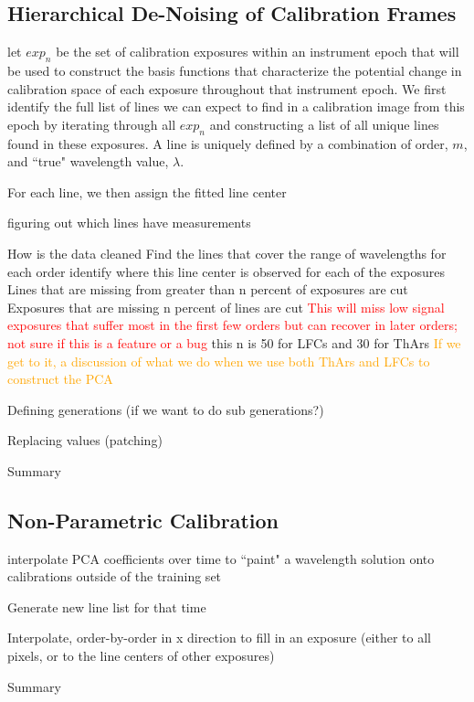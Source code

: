 \documentclass[12pt, letterpaper]{article}
\newcommand{\lz}[1]{\textcolor{orange}{#1}}
\begin{document}
\subsection{Hierarchical De-Noising of Calibration Frames}
let ${exp_n}$ be the set of calibration exposures within an instrument epoch that will be used to construct the basis functions that characterize the potential change in calibration space of each exposure throughout that instrument epoch.  We first identify the full list of lines we can expect to find in a calibration image from this epoch by iterating through all ${exp_n}$ and constructing a list of all unique lines found in these exposures.  A line is uniquely defined by a combination of order, $m$, and ``true" wavelength value, $\lambda$.

For each line, we then assign the fitted line center 

figuring out which lines have measurements

How is the data cleaned
Find the lines that cover the range of wavelengths for each order
identify where this line center is observed for each of the exposures
Lines that are missing from greater than n percent of exposures are cut
Exposures that are missing n percent of lines are cut \textcolor{red}{This will miss low signal exposures that suffer most in the first few orders but can recover in later orders; not sure if this is a feature or a bug}
this n is 50 for LFCs and 30 for ThArs
\lz{If we get to it, a discussion of what we do when we use both ThArs and LFCs to construct the PCA}

Defining generations (if we want to do sub generations?)

Replacing values (patching)

Summary

\subsection{Non-Parametric Calibration}
interpolate PCA coefficients over time to ``paint" a wavelength solution onto calibrations outside of the training set

Generate new line list for that time

Interpolate, order-by-order in x direction to fill in an exposure (either to all pixels, or to the line centers of other exposures)

Summary
\end{document}
